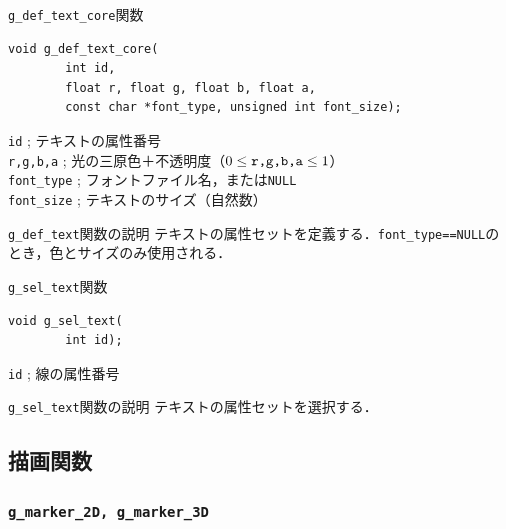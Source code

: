 \documentclass[platex,a4paper,12pt]{jsarticle}%
\begin{document}


\begin{itembox}[l]{\texttt{g\_def\_text\_core}関数}
\begin{verbatim}
void g_def_text_core(
        int id,
        float r, float g, float b, float a,
        const char *font_type, unsigned int font_size);
\end{verbatim}
\verb|id| ; テキストの属性番号\\
\verb|r,g,b,a| ; 光の三原色＋不透明度（$0\leq \verb|r,g,b,a| \leq 1$）\\
\verb|font_type| ; フォントファイル名，または\verb|NULL|\\
\verb|font_size| ; テキストのサイズ（自然数）
\end{itembox}

\begin{itembox}[l]{\texttt{g\_def\_text}関数の説明}
	テキストの属性セットを定義する．\verb|font_type==NULL|のとき，色とサイズのみ使用される．
\end{itembox}

\begin{itembox}[l]{\texttt{g\_sel\_text}関数}
\begin{verbatim}
void g_sel_text(
        int id);
\end{verbatim}
\verb|id| ; 線の属性番号
\end{itembox}

\begin{itembox}[l]{\texttt{g\_sel\_text}関数の説明}
テキストの属性セットを選択する．
\end{itembox}




\clearpage
\subsection{描画関数}
\subsubsection{\texttt{g\_marker\_2D, g\_marker\_3D}}
\end{document}
